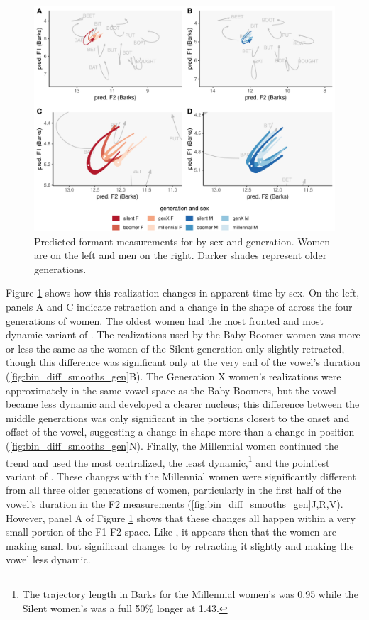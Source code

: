 \begin{figure}[tb!]
	\centering
	\includegraphics[width = 6.5in]{Figures/BIN/BIN_four_panel_plot.pdf}
	\caption[Predicted formant measurements for \bin by sex and generation.]{Predicted formant measurements for \bin by sex and generation. Women are on the left and men on the right. Darker shades represent older generations.}
	\label{fig:BIN_four_panel}
\end{figure}

Figure \ref{fig:BIN_four_panel} shows how this realization changes in apparent time by sex. On the left, panels A and C indicate retraction and a change in the shape of \bin across the four generations of women. The oldest women had the most fronted and most dynamic variant of \bin. The realizations used by the Baby Boomer women was more or less the same as the women of the Silent generation only slightly retracted, though this difference was significant only at the very end of the vowel's duration (\ref{fig:bin_diff_smooths_gen}B). The Generation X women's realizations were approximately in the same vowel space as the Baby Boomers, but the vowel became less dynamic and developed a clearer nucleus; this difference between the middle generations was only significant in the portions closest to the onset and offset of the vowel, suggesting a change in shape more than a change in position (\ref{fig:bin_diff_smooths_gen}N). Finally, the Millennial women continued the trend and used the most centralized, the least dynamic,\footnote{The trajectory length in Barks for the Millennial women's \bin was 0.95 while the Silent women's was a full 50\% longer at 1.43.} and the pointiest variant of \bin. These changes with the Millennial women were significantly different from all three older generations of women, particularly in the first half of the vowel's duration in the F2 measurements (\ref{fig:bin_diff_smooths_gen}J,R,V). However, panel A of Figure \ref{fig:BIN_four_panel} shows that these changes all happen within a very small portion of the F1-F2 space. Like \bit, it appears then that the women are making small but significant changes to \bin by retracting it slightly and making the vowel less dynamic.

